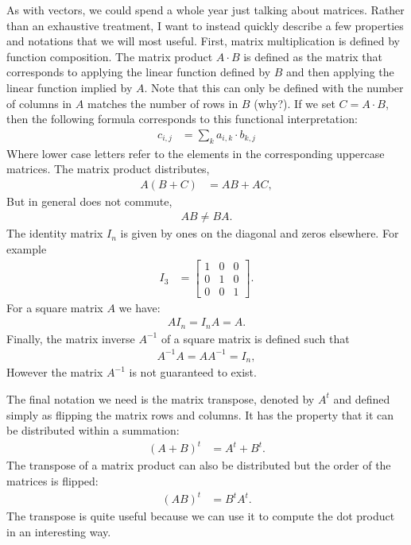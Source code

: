 \documentclass[12pt,hidelinks]{article}
\numberwithin{equation}{section}
\begin{document}
As with vectors, we could spend a whole year just talking about matrices.
Rather than an exhaustive treatment, I want to instead quickly describe a
few properties and notations that we will most useful. First, matrix multiplication
is defined by function composition. The matrix product $A \cdot B$ is defined
as the matrix that corresponds to applying the linear function defined by
$B$ and then applying the linear function implied by $A$. Note that this can
only be defined with the number of columns in $A$ matches the number of rows
in $B$ (why?). If we set $C = A \cdot B$, then the following formula corresponds
to this functional interpretation:
\begin{align}
c_{i, j} &= \sum_k a_{i, k} \cdot b_{k, j}
\end{align}
Where lower case letters refer to the elements in the corresponding uppercase
matrices. The matrix product distributes,
\begin{align}
A (B + C) &= AB + AC,
\end{align}
But in general does not commute,
\begin{align}
AB \neq BA.
\end{align}
The identity matrix $I_n$ is given by ones on the diagonal and zeros elsewhere.
For example
\begin{align}
I_3 &= \begin{bmatrix} 1 & 0 & 0 \\ 0 & 1 & 0 \\ 0 & 0 & 1 \end{bmatrix}.
\end{align}
For a square matrix $A$ we have:
\begin{align}
A I_n = I_n A = A.
\end{align}
Finally, the matrix inverse $A^{-1}$ of a square matrix is defined such that
\begin{align}
A^{-1} A = A A^{-1} = I_n,
\end{align}
However the matrix $A^{-1}$ is not guaranteed to exist.

The final notation we need is the matrix transpose, denoted by $A^t$ and
defined simply as flipping the matrix rows and columns. It has the property
that it can be distributed within a summation:
\begin{align}
(A + B)^t &= A^t + B^t.
\end{align}
The transpose of a matrix product can also be distributed but the order of
the matrices is flipped:
\begin{align}
(AB)^t &= B^t A^t.
\end{align}
The transpose is quite useful because we can use it to compute the dot product
in an interesting way.
\end{document}
